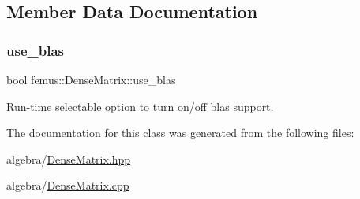 \subsection{Member Data Documentation}
\mbox{\label{classfemus_1_1_dense_matrix_a1f4f9cac8bd3c8b9ff1514c0b4ffedc6}} 
\subsubsection{\texorpdfstring{use\+\_\+blas}{use\_blas}}
{\footnotesize\ttfamily bool femus\+::\+Dense\+Matrix\+::use\+\_\+blas}



Run-\/time selectable option to turn on/off blas support. 



The documentation for this class was generated from the following files\+:\begin{DoxyCompactItemize}
\item 
algebra/\mbox{\hyperlink{_dense_matrix_8hpp}{Dense\+Matrix.\+hpp}}\item 
algebra/\mbox{\hyperlink{_dense_matrix_8cpp}{Dense\+Matrix.\+cpp}}\end{DoxyCompactItemize}
